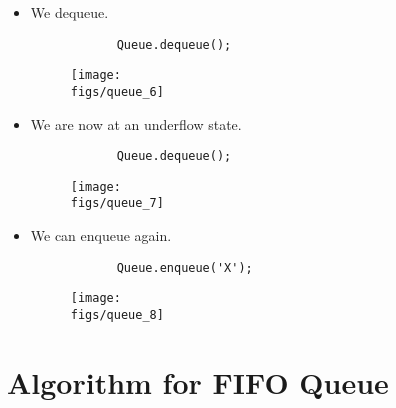 \begin{itemize}
    \item We dequeue.
        \begin{verbatim}
            Queue.dequeue();
        \end{verbatim}
        \begin{figure}[H]
            \centering
            \texttt{[image: \\figs/queue\_6]} 
        \end{figure}
    
    \item We are now at an underflow state.
        \begin{verbatim}
            Queue.dequeue();
        \end{verbatim}
        \begin{figure}[H]
            \centering
            \texttt{[image: \\figs/queue\_7]} 
        \end{figure}
    
    \item We can enqueue again.
        \begin{verbatim}
            Queue.enqueue('X');
        \end{verbatim}
        \begin{figure}[H]
            \centering
            \texttt{[image: \\figs/queue\_8]} 
        \end{figure}
\end{itemize}


\section{Algorithm for FIFO Queue}

